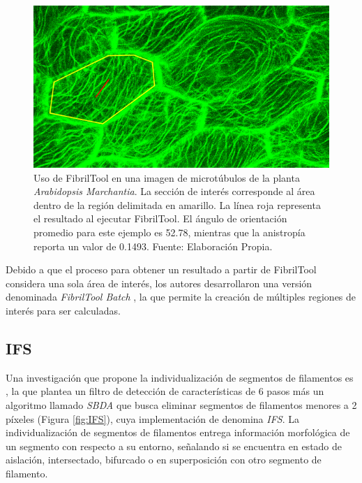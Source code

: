 \begin{figure}[h]
    \centering
    \includegraphics[scale=0.6]{evalImages/fibriltool-c1-mt-GFP-hipocotilo-zoom.png}
    \caption[Ejemplo de FibrilTool en microt\'ubulos]{Uso de FibrilTool en una imagen de microt\'ubulos de la planta {\it Arabidopsis Marchantia}. La secci\'on de inter\'es corresponde al \'area dentro de la regi\'on delimitada en amarillo. La l\'inea roja representa el resultado al ejecutar FibrilTool. El \'angulo de orientaci\'on promedio para este ejemplo es 52.78\textdegree, mientras que la anistrop\'ia reporta un valor de 0.1493. Fuente: Elaboraci\'on Propia.}
    \label{fig:FibrilToolexample}
\end{figure}

Debido a que el proceso para obtener un resultado a partir de FibrilTool considera una sola \'area de inter\'es, los autores desarrollaron una versi\'on denominada {\it FibrilTool Batch} , la que permite la creaci\'on de m\'ultiples regiones de inter\'es para ser calculadas.

\subsection{IFS}
Una investigaci\'on que propone la individualizaci\'on de segmentos de filamentos es \citet{qiu2014quantitative}, la que plantea un filtro de detecci\'on de caracter\'isticas de 6 pasos m\'as un algoritmo llamado \textit{SBDA} que busca eliminar segmentos de filamentos menores a 2 p\'ixeles (Figura \ref{fig:IFS}), cuya implementaci\'on de denomina {\it IFS}. La individualizaci\'on de segmentos de filamentos entrega informaci\'on morfol\'ogica de un segmento con respecto a su entorno, se\~nalando si se encuentra en estado de aislaci\'on, intersectado, bifurcado o en superposici\'on con otro segmento de filamento.

